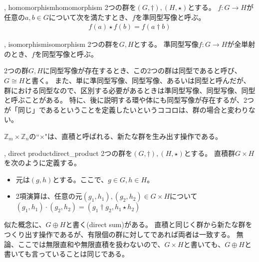 \begin{Defi}{, homomorphism}{homomorphism}
2つの群を$(G, \dagger),(H, \star)$とする。
$f:G\to H$が任意の$a,b\in G$について次を満たすとき、$f$を準同型写像と呼ぶ。
\begin{align*}
f(a) \star f(b) = f(a \dagger b)
\end{align*}
\end{Defi}

\begin{Defi}{, isomorphism}{isomorphism}
2つの群を$G,H$とする。
準同型写像$f:G\to H$が全単射のとき、$f$を同型写像と呼ぶ。
\end{Defi}

2つの群$G,H$に同型写像が存在するとき、この2つの群は同型であると呼び、$G\cong H$と書く。
また、単に準同型写像、同型写像、あるいは同型と呼んだが、群における同型なので、区別する必要があるときは準同型写像、同型写像、同型と呼ぶことがある。
特に、後に説明する環や体にも同型写像が存在するが、2つが「同じ」であるということを定義したいというココロは、群の場合と変わりない。

$\mathbb{Z}_m \times \mathbb{Z}_n$の``$\times$"は、直積と呼ばれる、新たな群を生み出す操作である。

\begin{Defi}{, direct product}{direct_product}
2つの群を$(G, \dagger),(H, \star)$とする。
直積群$G \times H$を次のように定義する。
\begin{itemize}
 \item 元は$(g, h)$とする。ここで、$g \in G, h \in H$。
 \item 2項演算は、任意の元$(g_1, h_1), (g_2, h_2)\in G \times H$について$(g_1, h_1)\cdot(g_2, h_2) = (g_1 \dagger g_2, h_1 \star h_2)$
\end{itemize}
\end{Defi}

似た概念に、$G \oplus H$と書く(direct sum)がある。
直積と同じく群から新たな群をつくり出す操作であるが、有限個の群に対してであれば両者は一致する。
無論、ここでは無限直和や無限直積を扱わないので、$G \times H$と書いても、$G \oplus H$と書いても言っていることは同じである。
